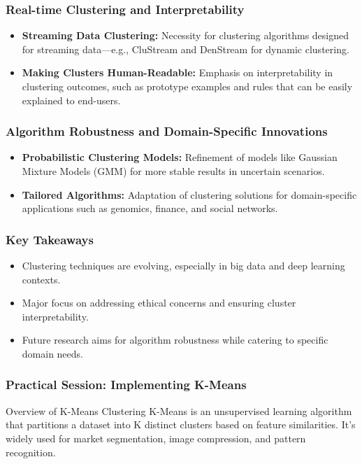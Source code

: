 \documentclass[aspectratio=169]{beamer}
\begin{document}
\begin{frame}[fragile]
    \frametitle{Real-time Clustering and Interpretability}
    \begin{itemize}
        \item \textbf{Streaming Data Clustering:} Necessity for clustering algorithms designed for streaming data—e.g., CluStream and DenStream for dynamic clustering.
        \item \textbf{Making Clusters Human-Readable:} Emphasis on interpretability in clustering outcomes, such as prototype examples and rules that can be easily explained to end-users.
    \end{itemize}
\end{frame}

\begin{frame}[fragile]
    \frametitle{Algorithm Robustness and Domain-Specific Innovations}
    \begin{itemize}
        \item \textbf{Probabilistic Clustering Models:} Refinement of models like Gaussian Mixture Models (GMM) for more stable results in uncertain scenarios.
        \item \textbf{Tailored Algorithms:} Adaptation of clustering solutions for domain-specific applications such as genomics, finance, and social networks.
    \end{itemize}
\end{frame}

\begin{frame}[fragile]
    \frametitle{Key Takeaways}
    \begin{itemize}
        \item Clustering techniques are evolving, especially in big data and deep learning contexts.
        \item Major focus on addressing ethical concerns and ensuring cluster interpretability.
        \item Future research aims for algorithm robustness while catering to specific domain needs.
    \end{itemize}
\end{frame}

\begin{frame}
    \frametitle{Practical Session: Implementing K-Means}
    \begin{block}{Overview of K-Means Clustering}
        K-Means is an unsupervised learning algorithm that partitions a dataset into K distinct clusters based on feature similarities. It's widely used for market segmentation, image compression, and pattern recognition.
    \end{block}
\end{frame}
\end{document}
